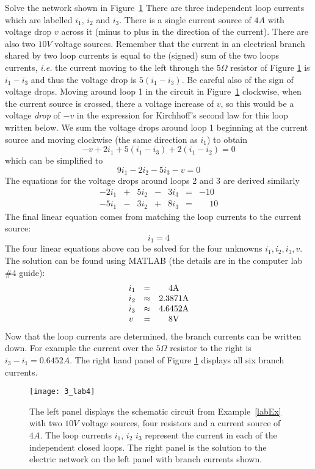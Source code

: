 \begin{example} 
\label{labEx} Solve the network shown in Figure~\ref{labExf}
{\rm There are three independent loop
currents which are labelled $i_1$, $i_2$ and $i_3$. There is a single 
current source  of $4A$ with voltage drop $v$ across it (minus to plus in the
direction of the current). There are also two $10V$ voltage sources.
Remember that the
current in an electrical branch shared by two loop currents is equal
to the (signed) sum of the two loops currents, \emph{i.e.} the current
moving to the left through the $5\Omega$ resistor of Figure \ref{labExf} is $i_1-i_
3$ and
thus the voltage drop is $5(i_1-i_3)$. Be careful also of the sign of
voltage drops. Moving around loop 1 in the circuit in Figure~\ref{labExf}
clockwise, when the current source is crossed, there a voltage
increase of $v$, so this would be a voltage {\em drop} of $-v$ in the
expression for Kirchhoff's second law for this loop written below.
We sum the voltage drops around loop 1 beginning at the current source
and moving clockwise (the same direction as $i_1$) to obtain
\[
-v + 2 i_1 + 5(i_1-i_3) + 2(i_1-i_2) = 0
\]
which can be simplified to 
\[
9i_1 -2 i_2 -5 i_3 -v = 0 
\]
The equations for the voltage drops around loops 2 and 3 are derived
similarly 
\[
\begin{array}{ccccccc}
-2i_1&+&5i_2&-& 3i_3 &=& -10 \\
-5i_1&-&3i_2&+& 8i_3 &=& \phantom{-}10
\end{array} 
\]
The final linear equation comes from matching the loop currents to the
current source:
\[
i_1 = 4
\]
The four linear equations above can be solved for the four unknowns $i_1, i_2, i_3, v$. 
The solution can be found using MATLAB (the details are in the computer lab \#4 
guide):
\[
\begin{array}{lcc}
i_1 &=& 4 {\rm A}\\
i_2 &\approx & 2.3871 {\rm A}\\
i_3 &\approx & 4.6452 {\rm A}\\
v & = & 8 {\rm V} 
\end{array}
\]
Now that the loop currents are determined, the branch currents can be
written down. For example the current over the $5\Omega$ resistor to
the right is 
$i_3-i_1 = 0.6452A$. The right hand panel of Figure \ref{labExf} displays
all six branch currents.}
\end{example}

\begin{figure}[htbp]
\centerline{\texttt{[image: 3\_lab4]}}
\caption{\label{labExf} The left panel displays the schematic
circuit from Example~\ref{labEx} with two $10V$ voltage sources, 
four resistors and a current
source of $4A$. The loop currents $i_1$, $i_2$ $i_3$ represent the
current in each of the independent closed loops. The right panel is
the solution to the electric network on the left panel with branch
currents shown.}
\end{figure}

